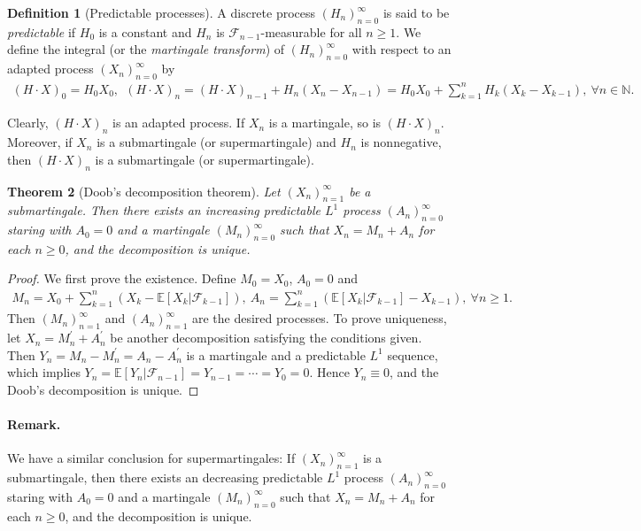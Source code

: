 \documentclass{article}
\numberwithin{equation}{section}
\newcommand{\E}{\mathbb{E}}
\theoremstyle{plain}
\newtheorem{theorem}{Theorem}[section]
\theoremstyle{definition}
\newtheorem{definition}[theorem]{Definition}
\begin{document}
\begin{definition}[Predictable processes]\label{def:3.17} A discrete process $(H_n)_{n=0}^\infty$ is said to be \textit{predictable} if $H_0$ is a constant and $H_n$ is $\mathscr{F}_{n-1}$-measurable for all $n\geq 1$.  We define the integral (or the \textit{martingale transform}) of $(H_n)_{n=0}^\infty$ with respect to an adapted process $(X_n)_{n=0}^\infty$ by
\begin{align*}
	(H\cdot X)_0 = H_0 X_0,\ \ (H\cdot X)_n = (H\cdot X)_{n-1}+H_n(X_n-X_{n-1}) = H_0X_0+\sum_{k=1}^n H_k(X_k-X_{k-1}),\ \forall n\in\mathbb{N}.
\end{align*}

Clearly, $(H\cdot X)_n$ is an adapted process. If $X_n$ is a martingale, so is $(H\cdot X)_n$. Moreover, if $X_n$ is a submartingale (or supermartingale) and $H_n$ is nonnegative, then $(H\cdot X)_n$ is a submartingale (or supermartingale).
\end{definition}

\begin{theorem}[Doob's decomposition theorem]
\label{thm:3.18} Let $(X_n)_{n=1}^\infty$ be a submartingale. Then there exists an increasing predictable $L^1$ process $(A_n)_{n=0}^\infty$ staring with $A_0=0$ and a martingale $(M_n)_{n=0}^\infty$ such that $X_n=M_n+A_n$ for each $n\geq 0$, and the decomposition is unique.
\end{theorem}
\begin{proof}
We first prove the existence. Define $M_0=X_0$, $A_0=0$ and 
\begin{align*}
	M_n=X_0+\sum_{k=1}^n\left(X_k - \E[X_k|\mathscr{F}_{k-1}]\right),\  A_n=\sum_{k=1}^n\left(\E[X_k|\mathscr{F}_{k-1}]-X_{k-1}\right),\ \forall n\geq 1.
\end{align*}
Then $(M_n)_{n=1}^\infty$ and $(A_n)_{n=1}^\infty$ are the desired processes. To prove uniqueness, let $X_n=M_n^\prime+A_n^\prime$ be another decomposition satisfying the conditions given. Then $Y_n=M_n-M_n^\prime=A_n - A_n^\prime$ is a martingale and a predictable $L^1$ sequence, which implies $Y_n=\E[Y_n|\mathscr{F}_{n-1}]=Y_{n-1}=\cdots = Y_0 = 0$. Hence $Y_n\equiv 0$, and the Doob's decomposition is unique.
\end{proof}
\paragraph{Remark.} We have a similar conclusion for supermartingales: If $(X_n)_{n=1}^\infty$ is a submartingale, then there exists an decreasing predictable $L^1$ process $(A_n)_{n=0}^\infty$ staring with $A_0=0$ and a martingale $(M_n)_{n=0}^\infty$ such that $X_n=M_n+A_n$ for each $n\geq 0$, and the decomposition is unique.
\end{document}
